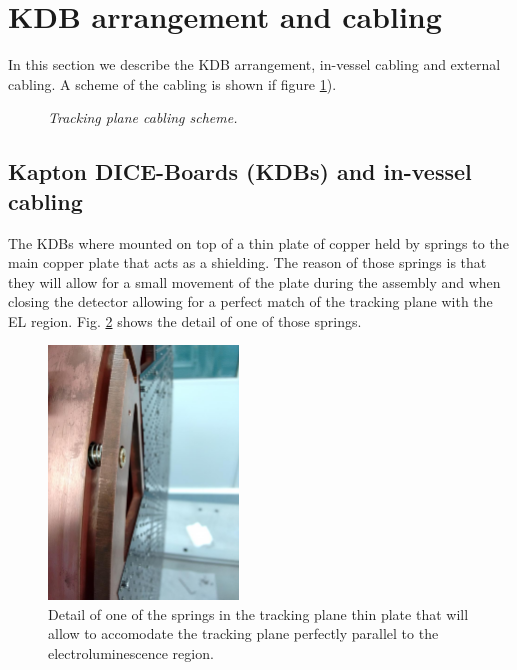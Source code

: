 \section{KDB arrangement and cabling}
\label{sec:DB}

In this section we describe the KDB arrangement, in-vessel cabling and external cabling. A scheme of the cabling is shown if 
figure \ref{fig:cabling:scheme}). 

\begin{figure}[ht]
    \bigskip
    \begin{center}\leavevmode
        \caption{\textit{Tracking plane cabling scheme.}}
        \label{fig:cabling:scheme}
    \end{center}
\end{figure}

\subsection*{Kapton DICE-Boards (KDBs) and in-vessel cabling}

The KDBs  where mounted on top of a thin plate of copper held by springs to the main copper plate that acts as a shielding. The reason of those springs is that they will allow for a small movement of the plate during the assembly and when closing the detector allowing for a perfect match of the tracking plane with the EL region. Fig. \ref{fig:spring_detail} shows the detail of one of those springs.

\begin{figure}[h!]
\begin{center}
\includegraphics[width=0.45\textwidth]{IMG/spring_plate_detail}
\caption{Detail of one of the springs in the tracking plane thin plate that will allow to accomodate the tracking plane perfectly parallel to the electroluminescence region.}
\label{fig:spring_detail}
\end{center}
\end{figure}

